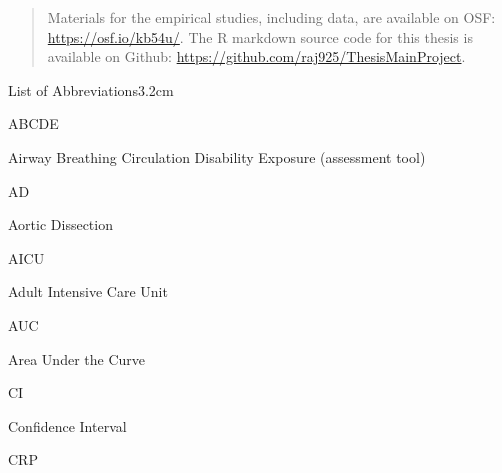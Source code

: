 \documentclass[a4paper, nobind]{templates/ociamthesis}
\begin{document}
\begin{romanpages}
\begin{abstract}
\hfill\break
Materials for the empirical studies, including data, are available on OSF: \url{https://osf.io/kb54u/}. The R markdown source code for this thesis is available on Github: \url{https://github.com/raj925/ThesisMainProject}.
\end{abstract}



\dominitoc %

\flushbottom

\tableofcontents

\listoffigures
	\mtcaddchapter

\listoftables
  \mtcaddchapter
\begin{mclistof}{List of Abbreviations}{3.2cm}

\item[ABCDE]

Airway Breathing Circulation Disability Exposure (assessment tool)

\item[AD]

Aortic Dissection

\item[AICU]

Adult Intensive Care Unit

\item[AUC]

Area Under the Curve

\item[CI]

Confidence Interval

\item[CRP]


\end{mclistof}
\end{romanpages}
\end{document}
